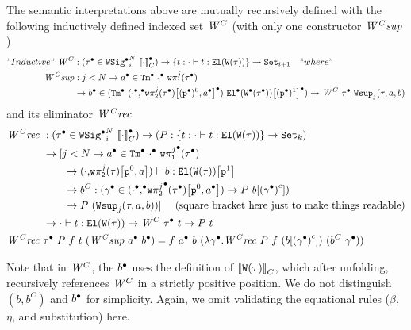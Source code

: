 The semantic interpretations above are 
mutually recursively defined with the following inductively defined indexed set $\mathit{W}^C$ (with only one constructor $\mathit{W^Csup}$)
%
\begin{align*}
  "Inductive"~\mathit{W}^C &: ({\tau}^\bullet \in {\ensuremath{{\texttt{WSig}}^\bullet}}_{i}^{N}~{{\llbracket {\cdot} \rrbracket}_C^\bullet}) \to \{ t :  {\cdot} \vdash {t} : {\texttt{El}({\texttt{W}({\tau})})}  \} \to \texttt{Set}_{i + 1} \quad "where" \\
    \mathit{W^Csup} &: j < N \to {a}^\bullet \in {\texttt{Tm}}^\bullet~{{\cdot}^\bullet}~{\texttt{w}\pi^{j}_{\texttt{1}}({{\tau}^\bullet})} \\
    & \to {b}^\bullet \in ({\texttt{Tm}}^\bullet~{({\cdot}^\bullet {,}^\bullet {\ensuremath{\texttt{w}\pi^{j}_{\texttt{2}}({{\tau}^\bullet})}}\!\left[{{(\texttt{p}^\bullet)^{0}},{{a}^\bullet}}\right]^\bullet) }~{{{\texttt{El}}^\bullet({{\texttt{W}}^\bullet({{\tau}^\bullet})})}\!\left[{(\texttt{p}^\bullet)^{1}}\right]^\bullet}) \to \mathit{W}^C~{\tau}^\bullet~\texttt{Wsup}_{j}({\tau},{a},{b})
\end{align*}
and its eliminator $\mathit{W^Crec}$
\begin{align*}
  \mathit{W^Crec} \  &: ({\tau}^\bullet \in {\ensuremath{{\texttt{WSig}}^\bullet}}_{i}^{N}~{{\llbracket {\cdot} \rrbracket}_C^\bullet}) \to 
    (P : \{ t :  {\cdot} \vdash {t} : {\texttt{El}({\texttt{W}({\tau})})}  \} \to \texttt{Set}_{k})  \\
    & \to [j < N \to  {a}^\bullet \in {\texttt{Tm}}^\bullet~{{\cdot}^\bullet}~{{{\texttt{w}\pi^{j}_{\texttt{1}}}}^\bullet({{\tau}^\bullet})} \\ 
    & \quad \quad \to 
     {({\cdot} {,} \ensuremath{{\texttt{w}\pi^{j}_{\texttt{2}}({{\tau}})}\!\left[{{\texttt{p}^{0}},{{a}}}\right]}) } \vdash {b} : {{\texttt{El}({\texttt{W}({\tau})})}\!\left[{\texttt{p}^{1}}\right]}  \\ 
    & \quad \quad \to b^C : ({\gamma}^\bullet \in ({\cdot}^\bullet {,}^\bullet {\ensuremath{{{\texttt{w}\pi^{j}_{\texttt{2}}}}^\bullet({{\tau}^\bullet})}}\!\left[{{\texttt{p}^{0}},{{a}^\bullet}}\right]) \to P~{b}\!\left[{{({{\gamma}^\bullet})}^c}\right]) \\
    & \quad \quad \to P~(\texttt{Wsup}_{j}({\tau},{a},{b})) ] \quad \text{ (square bracket here just to make things readable)} \\
    & \to  {\cdot} \vdash {t} : {\texttt{El}({\texttt{W}({\tau})})}  \to \mathit{W}^C~{\tau}^\bullet~t \to P~t \\
  \mathit{W^Crec} \  & {\tau}^\bullet~P~f~t~(\mathit{W^Csup}~{a}^\bullet~{b}^\bullet) = f~{a}^\bullet~b~(\lambda {\ensuremath{\gamma}}^\bullet. \mathit{W^Crec}~P~f~({b}\!\left[{{({{\gamma}^\bullet})}^c}\right])~(b^C~{\gamma}^\bullet))
\end{align*}

Note that in $\mathit{W}^C$, the ${b}^\bullet$ uses the definition of
${\llbracket {\ensuremath{\texttt{W}({\tau})}} \rrbracket}_C$, which after unfolding, recursively references $\mathit{W}^C$
in a strictly positive position. %
We do not distinguish $(b, b^C)$ and ${b}^\bullet$ for simplicity. Again, we omit validating the equational rules ($\beta$, $\eta$, and substitution) here.

